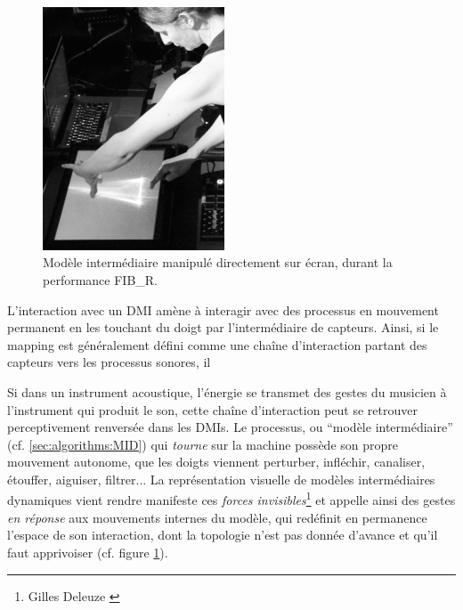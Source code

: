 \begin{figure}
	\captionsetup{format=plain}%
	\centering 
	\includegraphics[width=0.48\textwidth]{gfx/06_visual_representation/Xypre-Live.jpg}
	\caption[Xypre, modèle intermédiaire manipulé sur écran]{Modèle intermédiaire manipulé directement sur écran, durant la performance FIB\_R.}
	\label{fig:visual_representation:xypre-live}
\end{figure}
\par

\noindent L'interaction avec un \gls{DMI} amène à interagir avec des processus en mouvement permanent en les touchant du doigt par l'intermédiaire de capteurs. Ainsi, si le mapping est généralement défini comme une chaîne d'interaction partant des capteurs vers les processus sonores, il

Si dans un instrument acoustique, l'énergie se transmet des gestes du musicien à l'instrument qui produit le son, cette chaîne d'interaction peut se retrouver perceptivement renversée dans les \glspl{DMI}. Le processus, ou ``modèle intermédiaire'' (cf. \ref{sec:algorithms:MID}) qui \textit{tourne} sur la machine possède son propre mouvement autonome, que les doigts viennent perturber, infléchir, canaliser, étouffer, aiguiser, filtrer... La représentation visuelle de modèles intermédiaires dynamiques vient rendre manifeste ces \textit{forces invisibles}\footnote{ Gilles Deleuze \cite{deleuze_francis_1981}} et appelle ainsi des gestes \textit{en réponse} aux mouvements internes du modèle, qui redéfinit en permanence l'espace de son interaction, dont la topologie n'est pas donnée d'avance et qu'il faut apprivoiser (cf. figure \ref{fig:visual_representation:xypre-live}).

